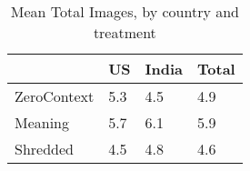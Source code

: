 \begin{table}[htbp]
\caption{\label{ImgsByGroup} Mean Total Images, by country and treatment}\centering\medskip
\begin{tabular}{|l|l|l|l|}\hline  
 & US  & India  & Total  \\ \hline  
ZeroContext & 5.3 & 4.5 & 4.9 \\ \hline 
Meaning & 5.7 & 6.1 & 5.9 \\ \hline 
Shredded & 4.5 & 4.8 & 4.6 \\ \hline 
  \end{tabular}
\end{table}
